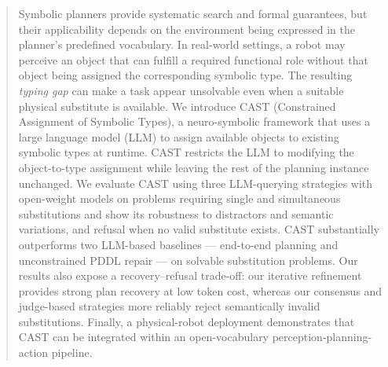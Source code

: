 % 
\begin{abstract} 

Symbolic planners provide systematic search and formal guarantees, but their applicability depends on the environment being expressed in the planner's predefined vocabulary. In real-world settings, a robot may perceive an object that can fulfill a required functional role without that object being assigned the corresponding symbolic type. The resulting \emph{typing gap} can make a task appear unsolvable even when a suitable physical substitute is available. We introduce CAST (Constrained Assignment of Symbolic Types), a neuro-symbolic framework that uses a large language model (LLM) to assign available objects to existing symbolic types at runtime. CAST restricts the LLM to modifying the object-to-type assignment while leaving the rest of the planning instance unchanged. We evaluate CAST using three LLM-querying strategies with open-weight models on problems requiring single and simultaneous substitutions and show its robustness to distractors and semantic variations, and refusal when no valid substitute exists. CAST substantially outperforms two LLM-based baselines --- end-to-end planning and unconstrained PDDL repair --- on solvable substitution problems. Our results also expose a recovery--refusal trade-off: our iterative refinement provides strong plan recovery at low token cost, whereas our consensus and judge-based strategies more reliably reject semantically invalid substitutions. Finally, a physical-robot deployment demonstrates that CAST can be integrated within an open-vocabulary perception-planning-action pipeline.



\end{abstract}

